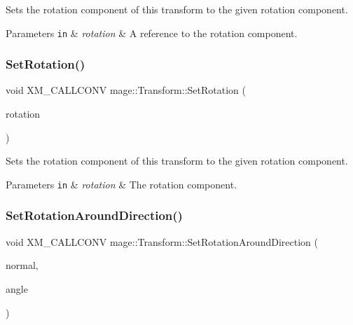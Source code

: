 Sets the rotation component of this transform to the given rotation component.


\begin{DoxyParams}[1]{Parameters}
\mbox{\tt in}  & {\em rotation} & A reference to the rotation component. \\
\hline
\end{DoxyParams}
\hypertarget{structmage_1_1_transform_a66ddc77bfbbf0b66e00d5ec8e10d1d65}{}\label{structmage_1_1_transform_a66ddc77bfbbf0b66e00d5ec8e10d1d65} 
\subsubsection{\texorpdfstring{Set\+Rotation()}{SetRotation()}\hspace{0.1cm}{\footnotesize\ttfamily [3/3]}}
{\footnotesize\ttfamily void X\+M\+\_\+\+C\+A\+L\+L\+C\+O\+NV mage\+::\+Transform\+::\+Set\+Rotation (\begin{DoxyParamCaption}\item[{F\+X\+M\+V\+E\+C\+T\+OR}]{rotation }\end{DoxyParamCaption})\hspace{0.3cm}{\ttfamily [noexcept]}}

Sets the rotation component of this transform to the given rotation component.


\begin{DoxyParams}[1]{Parameters}
\mbox{\tt in}  & {\em rotation} & The rotation component. \\
\hline
\end{DoxyParams}
\hypertarget{structmage_1_1_transform_a8d829e3aeef9a2a529ceb405b7b36c64}{}\label{structmage_1_1_transform_a8d829e3aeef9a2a529ceb405b7b36c64} 
\subsubsection{\texorpdfstring{Set\+Rotation\+Around\+Direction()}{SetRotationAroundDirection()}}
{\footnotesize\ttfamily void X\+M\+\_\+\+C\+A\+L\+L\+C\+O\+NV mage\+::\+Transform\+::\+Set\+Rotation\+Around\+Direction (\begin{DoxyParamCaption}\item[{F\+X\+M\+V\+E\+C\+T\+OR}]{normal,  }\item[{\hyperlink{namespacemage_aa97e833b45f06d60a0a9c4fc22ae02c0}{F32}}]{angle }\end{DoxyParamCaption})\hspace{0.3cm}{\ttfamily [noexcept]}}

